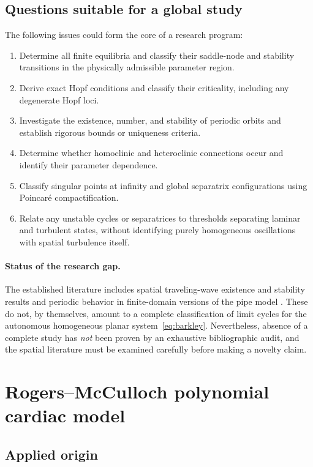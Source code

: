 \documentclass[11pt,a4paper]{article}
\begin{document}
\subsection{Questions suitable for a global study}

The following issues could form the core of a research program:
\begin{enumerate}
\item Determine all finite equilibria and classify their saddle-node and stability transitions in the physically admissible parameter region.
\item Derive exact Hopf conditions and classify their criticality, including any degenerate Hopf loci.
\item Investigate the existence, number, and stability of periodic orbits and establish rigorous bounds or uniqueness criteria.
\item Determine whether homoclinic and heteroclinic connections occur and identify their parameter dependence.
\item Classify singular points at infinity and global separatrix configurations using Poincar\'e compactification.
\item Relate any unstable cycles or separatrices to thresholds separating laminar and turbulent states, without identifying purely homogeneous oscillations with spatial turbulence itself.
\end{enumerate}

\paragraph{Status of the research gap.}
The established literature includes spatial traveling-wave existence and stability results \cite{KuehnSedlmeier2025} and periodic behavior in finite-domain versions of the pipe model \cite{Short2019}. These do not, by themselves, amount to a complete classification of limit cycles for the autonomous homogeneous planar system~\eqref{eq:barkley}. Nevertheless, absence of a complete study has \emph{not} been proven by an exhaustive bibliographic audit, and the spatial literature must be examined carefully before making a novelty claim.

\section{Rogers--McCulloch polynomial cardiac model}
\label{sec:rogers}

\subsection{Applied origin}
\end{document}
